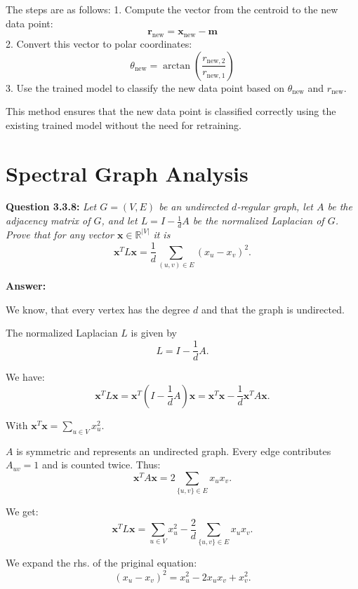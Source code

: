 \documentclass{article}
\begin{document}
\begin{multicols}{2}
    The steps are as follows:
    1. Compute the vector from the centroid to the new data point:
        \[
        \mathbf{r}_{\text{new}} = \mathbf{x}_{\text{new}} - \mathbf{m}
        \]
    2. Convert this vector to polar coordinates:
        \[
        \theta_{\text{new}} = \arctan\left(\frac{r_{\text{new},2}}{r_{\text{new},1}}\right)
        \]
    3. Use the trained model to classify the new data point based on \( \theta_{\text{new}} \) and \( r_{\text{new}} \).

    This method ensures that the new data point is classified correctly using the existing trained model without the need for retraining.

    \newpage

    \section{Spectral Graph Analysis}

    \noindent \textbf{Question 3.3.8:}  
    \textit{Let \( G = (V, E) \) be an undirected \( d \)-regular graph, let \( A \) be the adjacency matrix of \( G \), and let \( L = I - \frac{1}{d}A \) be the normalized Laplacian of \( G \). Prove that for any vector \( \mathbf{x} \in \mathbb{R}^{|V|} \) it is}  
    \[
    \mathbf{x}^T L \mathbf{x} = \frac{1}{d} \sum_{(u,v) \in E} (x_u - x_v)^2. \tag{2}
    \]

    \textbf{Answer:}

    We know, that every vertex has the degree \( d \) and that the graph is undirected.

    The normalized Laplacian \( L \) is given by
    \[
    L = I - \frac{1}{d} A.
    \]
    
    We have:
    \[
    \mathbf{x}^T L \mathbf{x} = \mathbf{x}^T\left(I - \frac{1}{d}A\right)\mathbf{x} = \mathbf{x}^T \mathbf{x} - \frac{1}{d}\mathbf{x}^T A \mathbf{x}.
    \]

    With \(\mathbf{x}^T \mathbf{x} = \sum_{u \in V} x_u^2.\) 

    \( A \) is symmetric and represents an undirected graph. Every edge contributes \( A_{uv}=1 \) and is counted twice. Thus:
    \[
    \mathbf{x}^T A \mathbf{x} = 2 \sum_{\{u,v\}\in E} x_u x_v.
    \]

    We get:
    \[
    \mathbf{x}^T L \mathbf{x} = \sum_{u\in V} x_u^2 - \frac{2}{d}\sum_{\{u,v\}\in E} x_u x_v.
    \]

    We expand the rhs. of the priginal equation:
    \[
    (x_u - x_v)^2 = x_u^2 - 2x_u x_v + x_v^2.
    \]


\end{multicols}
\end{document}

